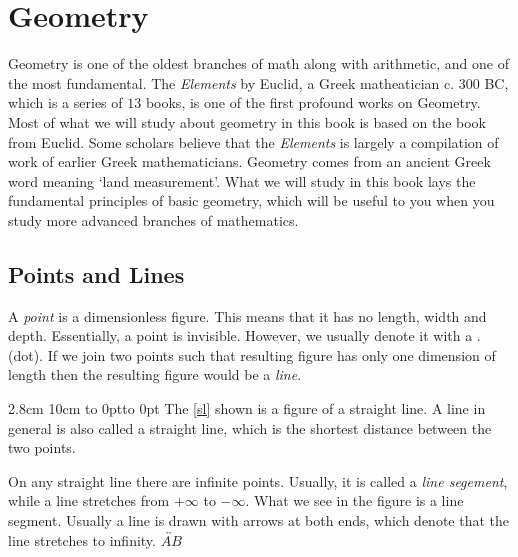 \chapter{Geometry}

%


\color{black}Geometry is one of the oldest branches of math along with arithmetic, and one of the most
fundamental. The {\it Elements} by Euclid, a Greek matheatician c. $300$ BC, which is a series of $13$
books, is one of the first profound works on Geometry. Most of what we will study about geometry in this
book is based on the book from Euclid. Some scholars believe that the {\it Elements} is
largely a compilation of work of earlier Greek mathematicians. Geometry comes from an ancient Greek word
meaning `land measurement'. What we will study in this book lays the fundamental principles of basic
geometry, which will be useful to you when you study more advanced branches of mathematics.

\section{Points and Lines}

%

A {\it point} is a dimensionless figure. This means that it has no length, width and depth. Essentially, a
point is invisible. However, we usually denote it with a .(dot). If we join two points such that resulting
figure has only one dimension of length then the resulting figure would be a {\it line}.

2.8cm 10cm
\hbox to 0pt{\vbox to 0pt{%
\vss}\hss}
\indent The \ref{sl} shown is a figure of a straight line. A line in general is also called a straight line,
which is the shortest distance between the two points.

On any straight line there are infinite points. Usually, it is called a {\it line segement}, while a line
stretches from $+\infty$ to $-\infty$. What we see in the figure is a line segment. Usually a line is drawn
with arrows at both ends, which denote that the line stretches to infinity.
$\overleftrightarrow{AB}$
